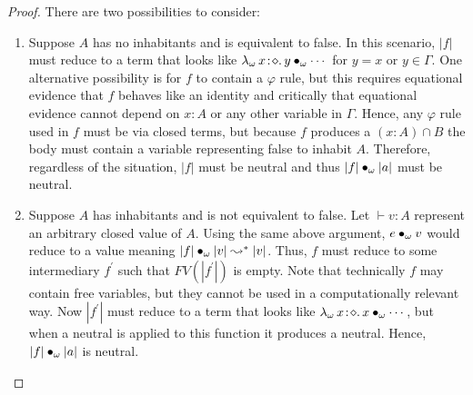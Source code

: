 \begin{proof}
    There are two possibilities to consider:
    \begin{enumerate}
        \item {
            Suppose $A$ has no inhabitants and is equivalent to false.
            In this scenario, $|f|$ must reduce to a term that looks like ${\lambda_\omega}\, x\! : \! \diamond.\, y \bullet_{\omega} \cdots$ for $y = x$ or $y \in \Gamma$.
            One alternative possibility is for $f$ to contain a $\varphi$ rule, but this requires equational evidence that $f$ behaves like an identity and critically that equational evidence cannot depend on $x : A$ or any other variable in $\Gamma$.
            Hence, any $\varphi$ rule used in $f$ must be via closed terms, but because $f$ produces a $(x : A) \cap B$ the body must contain a variable representing false to inhabit $A$.
            Therefore, regardless of the situation, $|f|$ must be neutral and thus $|f| \bullet_{\omega} |a|$ must be neutral.
        }
        \item {
            Suppose $A$ has inhabitants and is not equivalent to false.
            Let $\vdash v : A$ represent an arbitrary closed value of $A$.
            Using the same above argument, $e \bullet_{\omega} v$ would reduce to a value meaning $|f| \bullet_{\omega} |v| \leadsto^* |v|$.
            Thus, $f$ must reduce to some intermediary $f^\prime$ such that $FV(|f^\prime|)$ is empty.
            Note that technically $f$ may contain free variables, but they cannot be used in a computationally relevant way.
            Now $|f^\prime|$ must reduce to a term that looks like ${\lambda_\omega}\, x\! : \! \diamond.\, x \bullet_{\omega} \cdots$, but when a neutral is applied to this function it produces a neutral.
            Hence, $|f| \bullet_{\omega} |a|$ is neutral.
        }
    \end{enumerate}
\end{proof}

